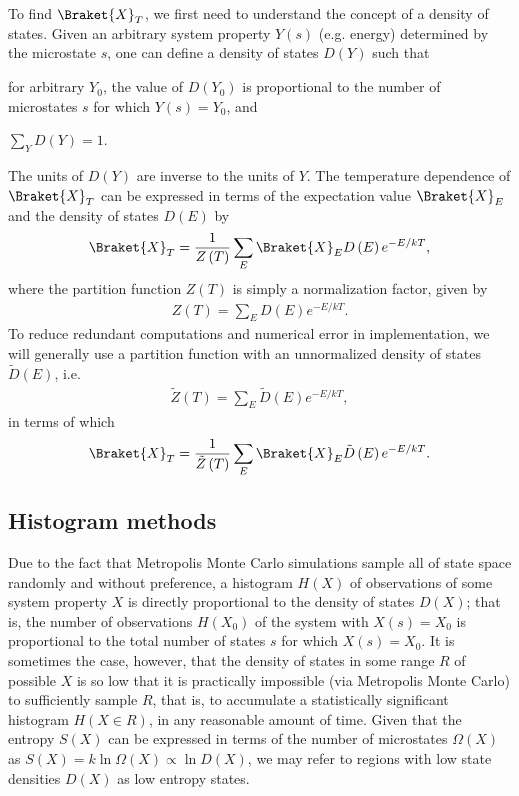 \documentclass[11pt]{article}
\newcommand{\bk}{\Braket} %
\newcommand{\f}[2]{\dfrac{#1}{#2}} %
\newcommand{\p}[1]{\left(#1\right)} %
\begin{document}
To find $\bk{X}_T$, we first need to understand the concept of a
density of states. Given an arbitrary system property $Y\p{s}$
(e.g. energy) determined by the microstate $s$, one can define a
density of states $D\p{Y}$ such that
\begin{enumerate*}[label=\roman*)]
\item for arbitrary $Y_0$, the value of $D\p{Y_0}$ is proportional to
  the number of microstates $s$ for which $Y\p{s}=Y_0$, and
\item $\sum_YD\p{Y}=1$.
\end{enumerate*}
The units of $D\p{Y}$ are inverse to the units of $Y$. The temperature
dependence of $\bk{X}_T$ can be expressed in terms of the expectation
value $\bk{X}_E$ and the density of states $D\p{E}$ by
\begin{align}
  \bk{X}_T=\f1{Z\p{T}}\sum_E\bk{X}_ED\p{E}e^{-E/kT},
  \label{eq:XT_norm}
\end{align}
where the partition function $Z\p{T}$ is simply a normalization
factor, given by
\begin{align}
  Z\p{T}=\sum_ED\p{E}e^{-E/kT}.
\end{align}
To reduce redundant computations and numerical error in
implementation, we will generally use a partition function with an
unnormalized density of states $\tilde D\p{E}$, i.e.
\begin{align}
  \tilde Z\p{T}=\sum_E\tilde D\p{E}e^{-E/kT},
\end{align}
in terms of which
\begin{align}
  \bk{X}_T=\f1{\tilde Z\p{T}}\sum_E\bk{X}_E\tilde D\p{E}e^{-E/kT}.
  \label{eq:XT}
\end{align}

\subsection{Histogram methods}
\label{sec:histogram_methods}

Due to the fact that Metropolis Monte Carlo simulations sample all of
state space randomly and without preference, a histogram $H\p{X}$ of
observations of some system property $X$ is directly proportional to
the density of states $D\p{X}$; that is, the number of observations
$H\p{X_0}$ of the system with $X\p{s}=X_0$ is proportional to the
total number of states $s$ for which $X\p{s}=X_0$. It is sometimes the
case, however, that the density of states in some range $R$ of
possible $X$ is so low that it is practically impossible (via
Metropolis Monte Carlo) to sufficiently sample $R$, that is, to
accumulate a statistically significant histogram $H\p{X\in R}$, in any
reasonable amount of time. Given that the entropy $S\p{X}$ can be
expressed in terms of the number of microstates $\Omega\p{X}$ as
$S\p{X}=k\ln\Omega\p{X}\propto\ln D\p{X}$, we may refer to regions
with low state densities $D\p{X}$ as low entropy states.
\end{document}
